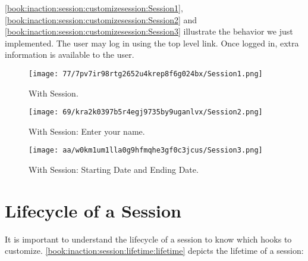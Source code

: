 \documentclass[a4paper,10pt,twoside]{book}
\begin{document}
\autoref{book:inaction:session:customizesession:Session1}, \autoref{book:inaction:session:customizesession:Session2} and \autoref{book:inaction:session:customizesession:Session3} illustrate the behavior we just implemented. The user may log in using the top level link. Once logged in, extra information is available to the user.

\begin{figure}[h!tbp]
	\begin{center}
		\texttt{[image: 77/7pv7ir98rtg2652u4krep8f6g024bx/Session1.png]}
		\caption{With Session.\label{book:inaction:session:customizesession:Session1}}
	\end{center}
\end{figure}
 
\begin{figure}[h!tbp]
	\begin{center}
		\texttt{[image: 69/kra2k0397b5r4egj9735by9uganlvx/Session2.png]}
		\caption{With Session: Enter your name.\label{book:inaction:session:customizesession:Session2}}
	\end{center}
\end{figure}

\begin{figure}[h!tbp]
	\begin{center}
		\texttt{[image: aa/w0km1um1lla0g9hfmqhe3gf0c3jcus/Session3.png]}
		\caption{With Session: Starting Date and Ending Date.\label{book:inaction:session:customizesession:Session3}}
	\end{center}
\end{figure}


\section{Lifecycle of a Session}
\label{book:inaction:session:lifetime}

It is important to understand the lifecycle of a session to know which hooks to customize. 
\autoref{book:inaction:session:lifetime:lifetime} depicts the lifetime of a session:
\end{document}
